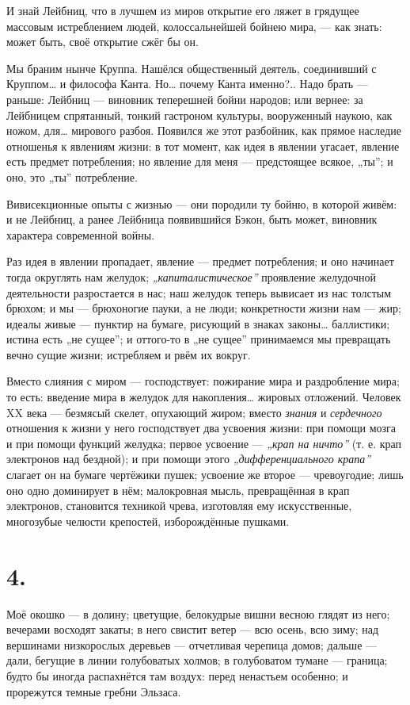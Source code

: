 \documentclass[12pt,a4paper,oneside]{book}
\begin{document}
И знай Лейбниц, что в лучшем из миров открытие его ляжет в грядущее массовым истреблением людей, колоссальнейшей бойнею мира, — как знать: может быть, своё открытие сжёг бы он.

Мы браним нынче Круппа. Нашёлся общественный деятель, соединивший с Круппом… и философа Канта. Но… почему Канта именно?.. Надо брать — раньше: Лейбниц — виновник теперешней бойни народов; или вернее: за Лейбницем спрятанный, тонкий гастроном культуры, вооруженный наукою, как ножом, для… мирового разбоя. Появился же этот разбойник, как прямое наследие отношенья к явлениям жизни: в тот момент, как идея в явлении угасает, явление есть предмет потребления; но явление для меня — предстоящее всякое, „ты”; и оно, это „ты” потребление.

Вивисекционные опыты с жизнью — они породили ту бойню, в которой живём: и не Лейбниц, а ранее Лейбница появившийся Бэкон, быть может, виновник характера современной войны.

Раз идея в явлении пропадает, явление — предмет потребления; и оно начинает тогда округлять нам желудок; \emph{„капиталистическое”} проявление желудочной деятельности разростается в нас; наш желудок теперь вывисает из нас толстым брюхом; и мы — брюхоногие пауки, а не люди; конкретности жизни нам — жир; идеалы живые — пунктир на бумаге, рисующий в знаках законы… баллистики; истина есть „не сущее”;  и оттого-то в „не сущее” принимаемся мы превращать вечно сущие жизни; истребляем и рвём их вокруг.

Вместо слияния с миром — господствует: пожирание мира и раздробление мира; то есть: введение мира в желудок для накопления… жировых отложений. Человек XX века — безмясый скелет, опухающий жиром; вместо \emph{знания} и \emph{сердечного} отношения к жизни у него господствует два усвоения жизни: при помощи мозга и при помощи функций желудка; первое усвоение — \emph{„крап на ничто”} (т. е. крап электронов над бездной); и при помощи этого \emph{„дифференциального крапа”} слагает он на бумаге чертёжики пушек; усвоение же второе — чревоугодие; лишь оно одно доминирует в нём; малокровная мысль, превращённая в крап электронов, становится техникой чрева, изготовляя ему искусственные, многозубые челюсти крепостей, изборождённые пушками.

\section*{4.}

Моё окошко — в долину; цветущие, белокудрые вишни весною глядят из него; вечерами восходят закаты; в него свистит ветер — всю осень, всю зиму; над вершинами низкорослых деревьев — отчетливая черепица домов; дальше — дали, бегущие в линии голубоватых холмов; в голубоватом тумане — граница; будто бы иногда распахнётся там воздух: перед ненастьем особенно; и прорежутся темные гребни Эльзаса.
\end{document}
